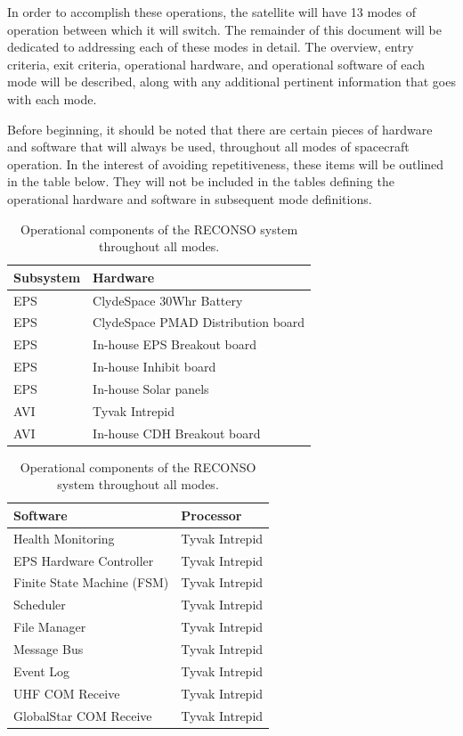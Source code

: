 \documentclass{article}
\begin{document}
\newpage

In order to accomplish these operations, the satellite will have 13 modes of operation between which it will switch. The remainder of this document will be dedicated to addressing each of these modes in detail. The overview, entry criteria, exit criteria, operational hardware, and operational software of each mode will be described, along with any additional pertinent information that goes with each mode.

Before beginning, it should be noted that there are certain pieces of hardware and software that will always be used, throughout all modes of spacecraft operation. In the interest of avoiding repetitiveness, these items will be outlined in the table below. They will not be included in the tables defining the operational hardware and software in subsequent mode definitions.

\begin{table}[h!]
\caption{Operational components of the RECONSO system throughout all modes.}
\begin{adjustbox}{center}
\begin{tabular}{|l|l|}
\hline
Subsystem & Hardware \\ \hline \hline
EPS & ClydeSpace 30Whr Battery \\ \hline
EPS & ClydeSpace PMAD Distribution board  \\ \hline
EPS & In-house EPS Breakout board \\ \hline
EPS & In-house Inhibit board  \\ \hline
EPS & In-house Solar panels  \\ \hline \hline
AVI & Tyvak Intrepid \\ \hline
AVI & In-house CDH Breakout board \\ \hline 
\end{tabular}

\quad

\begin{tabular}{|l|l|}
\hline
Software & Processor \\ \hline \hline
Health Monitoring & Tyvak Intrepid \\ \hline
EPS Hardware Controller & Tyvak Intrepid \\ \hline
Finite State Machine (FSM) & Tyvak Intrepid \\ \hline
Scheduler & Tyvak Intrepid \\ \hline
File Manager & Tyvak Intrepid \\ \hline
Message Bus & Tyvak Intrepid \\ \hline
Event Log & Tyvak Intrepid \\ \hline
UHF COM Receive & Tyvak Intrepid \\ \hline
GlobalStar COM Receive & Tyvak Intrepid \\ \hline
\end{tabular}
\end{adjustbox}
\end{table}
\end{document}
